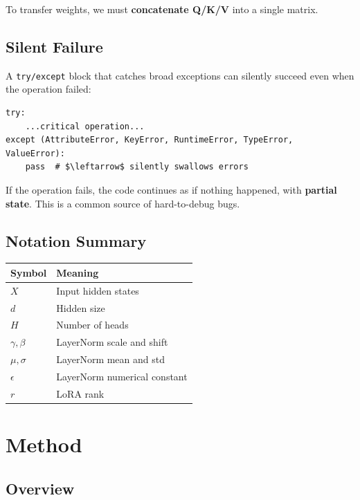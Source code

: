 To transfer weights, we must \textbf{concatenate Q/K/V} into a single matrix.

\subsection{Silent Failure}

A \texttt{try/except} block that catches broad exceptions can silently succeed 
even when the operation failed:

\begin{lstlisting}
try:
    ...critical operation...
except (AttributeError, KeyError, RuntimeError, TypeError, ValueError):
    pass  # $\leftarrow$ silently swallows errors
\end{lstlisting}

If the operation fails, the code continues as if nothing happened, with 
\textbf{partial state}. This is a common source of hard-to-debug bugs.

\subsection{Notation Summary}

\begin{table}[H]
\centering
\small
\begin{tabular}{ll}
\toprule
\textbf{Symbol} & \textbf{Meaning} \\
\midrule
$X$ & Input hidden states \\
$d$ & Hidden size \\
$H$ & Number of heads \\
$\gamma, \beta$ & LayerNorm scale and shift \\
$\mu, \sigma$ & LayerNorm mean and std \\
$\epsilon$ & LayerNorm numerical constant \\
$r$ & LoRA rank \\
\bottomrule
\end{tabular}
\end{table}




\section{Method}

\subsection{Overview}

